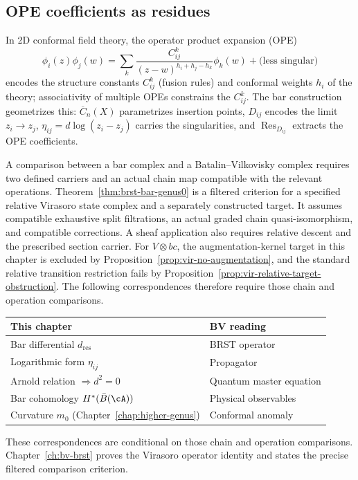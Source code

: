 \subsection{OPE coefficients as residues}

\begin{remark}\label{rem:physical-genesis}
In 2D conformal field theory, the operator product expansion (OPE)
\[\phi_i(z)\phi_j(w) = \sum_{k} \frac{C_{ij}^k}{(z-w)^{h_i+h_j-h_k}} \phi_k(w) + \text{(less singular)}\]
encodes the structure constants $C_{ij}^k$ (fusion rules) and conformal weights $h_i$ of the theory; associativity of multiple OPEs constrains the $C_{ij}^k$.
The bar construction geometrizes this: $\overline{C}_n(X)$ parametrizes insertion points, $D_{ij}$ encodes the limit $z_i \to z_j$, $\eta_{ij} = d\log(z_i - z_j)$ carries the singularities, and $\operatorname{Res}_{D_{ij}}$ extracts the OPE coefficients.
\end{remark}

\begin{remark}\label{rem:bv-parallel-track}
A comparison between a bar complex and a Batalin--Vilkovisky complex requires two defined carriers and an actual chain map compatible with the relevant operations.
Theorem~\ref{thm:brst-bar-genus0} is a filtered criterion for a specified relative Virasoro state complex and a separately constructed target.
It assumes compatible exhaustive split filtrations, an actual graded chain quasi-isomorphism, and compatible corrections.
A sheaf application also requires relative descent and the prescribed section carrier.
For $V\otimes bc$, the augmentation-kernel target in this chapter is excluded by Proposition~\ref{prop:vir-no-augmentation}, and the standard relative transition restriction fails by Proposition~\ref{prop:vir-relative-target-obstruction}.
The following correspondences therefore require those chain and operation comparisons.

\begin{center}
\small
\begin{tabular}{ll}
\textbf{This chapter} & \textbf{BV reading} \\ \hline
Bar differential $d_{\mathrm{res}}$ & BRST operator \\
Logarithmic form $\eta_{ij}$ & Propagator \\
Arnold relation $\Rightarrow d^2 = 0$ & Quantum master equation \\
Bar cohomology $H^*(\bar{B}(\cA))$ & Physical observables \\
Curvature $m_0$ (Chapter~\ref{chap:higher-genus}) & Conformal anomaly
\end{tabular}
\end{center}
\noindent
These correspondences are conditional on those chain and operation comparisons.
Chapter~\ref{ch:bv-brst} proves the Virasoro operator identity and states the precise filtered comparison criterion.
\end{remark}

